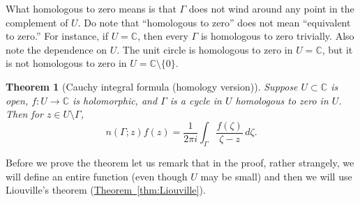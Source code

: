 \documentclass[12pt,openany]{book}
\newcommand{\C}{{\mathbb{C}}}
\newcommand{\myquote}[1]{``#1''}
\theoremstyle{plain}
\newtheorem{thm}{Theorem}[section]
\theoremstyle{remark}
\theoremstyle{definition}
\theoremstyle{exercise}
\theoremstyle{example}
\newcommand{\thmref}[1]{\hyperref[#1]{Theorem~\ref*{#1}}}
\begin{document}
What homologous to zero means is that $\Gamma$ does not wind around any
point in the complement of $U$.
Do note that \myquote{homologous to zero} does not mean
\myquote{equivalent to zero.}
For instance, if $U = \C$, then every $\Gamma$ is homologous to zero trivially.
Also note the dependence on $U$.  The unit circle is homologous to zero in
$U = \C$, but it is not homologous to zero in $U = \C \setminus \{ 0 \}$.

\begin{thm}[Cauchy integral formula (homology version)]
\label{thm:CIFhomology}
Suppose $U \subset \C$ is open, $f \colon U \to \C$ is holomorphic, and
$\Gamma$ is
a cycle
in $U$
homologous to zero in $U$.
Then for $z \in U \setminus \Gamma$,
\begin{equation*}
n(\Gamma;z)
f(z)
=
\frac{1}{2\pi i}
\int_{\Gamma}
\frac{f(\zeta)}{\zeta-z}
\,
d \zeta .
\end{equation*}
\end{thm}

Before we prove the theorem let us remark
that in the proof, rather strangely, we will define an entire
function (even though $U$ may be small) and then we will use
Liouville's theorem (\thmref{thm:Liouville}).
\end{document}
